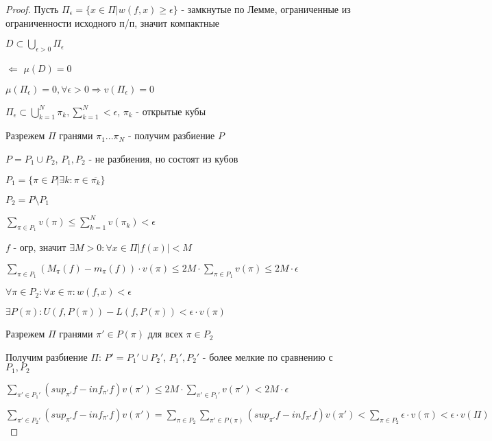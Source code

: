     \begin{proof}
        \par Пусть $\Pi_\epsilon = \{x \in \Pi | w(f,x) \ge \epsilon \}$ - замкнутые по Лемме, ограниченные из ограниченности исходного п/п, значит компактные
        \par $D \subset \bigcup_{\epsilon > 0} \Pi_\epsilon$
        \bigskip
        \par $\boxed{\Leftarrow}$ $\mu(D) = 0$ 
        \par $\mu(\Pi_\epsilon) = 0, \forall \epsilon>0 \Rightarrow v(\Pi_\epsilon) = 0$
        \par $\Pi_\epsilon \subset \bigcup\limits_{k=1}^N \pi_k, \sum\limits_{k=1}^N < \epsilon$, $\pi_k$ - открытые кубы
        \par Разрежем $\Pi$ гранями $\pi_1 ... \pi_N$ - получим разбиение $P$
        \par $P = P_1 \cup P_2$, $P_1, P_2$ - не разбиения, но состоят из кубов
        \par $P_1 = \{\pi \in P | \exists k: \pi \in \overline{\pi_k} \}$
        \par $P_2 = P \setminus P_1$
        \par $\sum\limits_{\pi \in P_1} v(\pi) \le \sum\limits_{k=1}^N v(\pi_k) < \epsilon$
        \bigskip
        \par $f$ - огр, значит $\exists M>0: \forall x \in \Pi |f(x)| < M$
        \par $\sum\limits_{\pi \in P_1} (M_\pi(f) - m_\pi(f)) \cdot v(\pi) \le 2M \cdot \sum\limits_{\pi \in P_1} v(\pi) \le 2M \cdot \epsilon$
        \bigskip
        \par $\forall \pi \in P_2: \forall x\in \pi: w(f, x) < \epsilon$
        \par $\exists P(\pi): U(f, P(\pi)) - L(f, P(\pi)) < \epsilon \cdot v(\pi)$
        \par Разрежем $\Pi$ гранями $\pi' \in P(\pi)$ для всех $\pi \in P_2$
        \par Получим разбиение $\Pi$: $P' = P_1' \cup P_2'$, $P_1', P_2'$ - более мелкие по сравнению с $P_1, P_2$
        \par $\sum\limits_{\pi' \in P_1'} (sup_{\pi'} f - inf_{\pi'} f)v(\pi') \le 2M \cdot \sum\limits_{\pi' \in P_1'} v(\pi') < 2M \cdot \epsilon$
        \bigskip
        \par $\sum\limits_{\pi' \in P_2'} (sup_{\pi'} f - inf_{\pi'} f)v(\pi') = \sum\limits_{\pi \in P_2} \sum\limits_{\pi' \in P(\pi)} (sup_{\pi'} f - inf_{\pi'} f)v(\pi') < \sum\limits_{\pi \in P_2} \epsilon \cdot v(\pi) < \epsilon \cdot v(\Pi)$

\end{proof}
